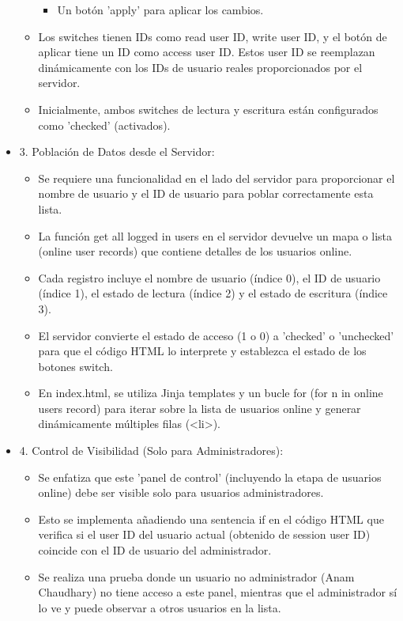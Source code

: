 \documentclass{report}
\begin{document}
\begin{itemize}
\begin{itemize}
\begin{itemize}
                    \item Un botón 'apply' para aplicar los cambios.
                \end{itemize}
            \item Los switches tienen IDs como read user ID, write user ID, y el botón de aplicar tiene un ID como access user ID. Estos user 
            ID se reemplazan dinámicamente con los IDs de usuario reales proporcionados por el servidor.
            \item Inicialmente, ambos switches de lectura y escritura están configurados como 'checked' (activados).
        \end{itemize}
    \item 3. Población de Datos desde el Servidor:
        \begin{itemize}
            \item Se requiere una funcionalidad en el lado del servidor para proporcionar el nombre de usuario y el ID de usuario para 
            poblar correctamente esta lista.
            \item La función get all logged in users en el servidor devuelve un mapa o lista (online user records) que contiene detalles 
            de los usuarios online.
            \item Cada registro incluye el nombre de usuario (índice 0), el ID de usuario (índice 1), el estado de lectura (índice 2) y 
            el estado de escritura (índice 3).
            \item El servidor convierte el estado de acceso (1 o 0) a 'checked' o 'unchecked' para que el código HTML lo interprete y 
            establezca el estado de los botones switch.
            \item En index.html, se utiliza Jinja templates y un bucle for (for n in online users record) para iterar sobre la lista de 
            usuarios online y generar dinámicamente múltiples filas (<li>).
        \end{itemize}
    \item 4. Control de Visibilidad (Solo para Administradores):
        \begin{itemize}
            \item Se enfatiza que este 'panel de control' (incluyendo la etapa de usuarios online) debe ser visible solo 
            para usuarios administradores.
            \item Esto se implementa añadiendo una sentencia if en el código HTML que verifica si el user ID del usuario actual 
            (obtenido de session user ID) coincide con el ID de usuario del administrador.
            \item Se realiza una prueba donde un usuario no administrador (Anam Chaudhary) no tiene acceso a este panel, mientras que el 
            administrador sí lo ve y puede observar a otros usuarios en la lista.
        \end{itemize}
\end{itemize}
\end{document}
